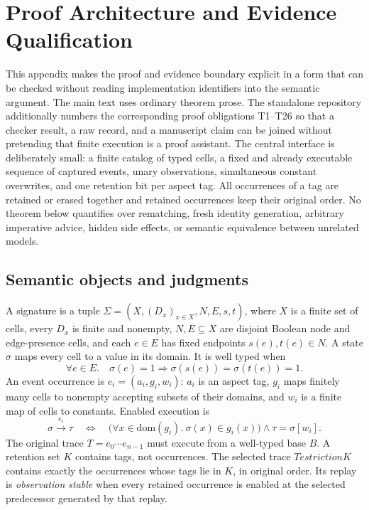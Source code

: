 \section{Proof Architecture and Evidence Qualification}
\label{app:proofs}

This appendix makes the proof and evidence boundary explicit in a form that can be
checked without reading implementation identifiers into the semantic argument.  The
main text uses ordinary theorem prose.  The standalone repository additionally
numbers the corresponding proof obligations T1--T26 so that a checker result, a raw
record, and a manuscript claim can be joined without pretending that finite execution
is a proof assistant.  The central interface is deliberately small: a finite catalog
of typed cells, a fixed and already executable sequence of captured events, unary
observations, simultaneous constant overwrites, and one retention bit per aspect tag.
All occurrences of a tag are retained or erased together and retained occurrences keep
their original order.  No theorem below quantifies over rematching, fresh identity
generation, arbitrary imperative advice, hidden side effects, or semantic equivalence
between unrelated models.

\subsection{Semantic objects and judgments}

A signature is a tuple
$\Sigma=(X,(D_x)_{x\in X},N,E,s,t)$, where $X$ is a finite set of
cells, every $D_x$ is finite and nonempty, $N,E\subseteq X$ are disjoint
Boolean node and edge-presence cells, and each $e\in E$ has fixed endpoints
$s(e),t(e)\in N$.  A state $\sigma$ maps every cell to a value in its domain.
It is well typed when
\[
  \forall e\in E.\quad \sigma(e)=1\Longrightarrow
       \sigma(s(e))=\sigma(t(e))=1.
\]
An event occurrence is $e_i=(a_i,g_i,w_i)$: $a_i$ is an aspect tag,
$g_i$ maps finitely many cells to nonempty accepting subsets of their domains,
and $w_i$ is a finite map of cells to constants.  Enabled execution is
\[
 \sigma \xrightarrow{e_i} \tau
 \quad\Longleftrightarrow\quad
 \bigl(\forall x\in\mathrm{dom}(g_i).\ \sigma(x)\in g_i(x)\bigr)
 \land \tau=\sigma[w_i].
\]
The original trace $T=e_0\cdots e_{n-1}$ must execute from a well-typed base
$B$.  A retention set $K$ contains tags, not occurrences.  The selected trace
$T\!
estriction K$ contains exactly the occurrences whose tags lie in $K$,
in original order.  Its replay is \emph{observation stable} when every retained
occurrence is enabled at the selected predecessor generated by that replay.


